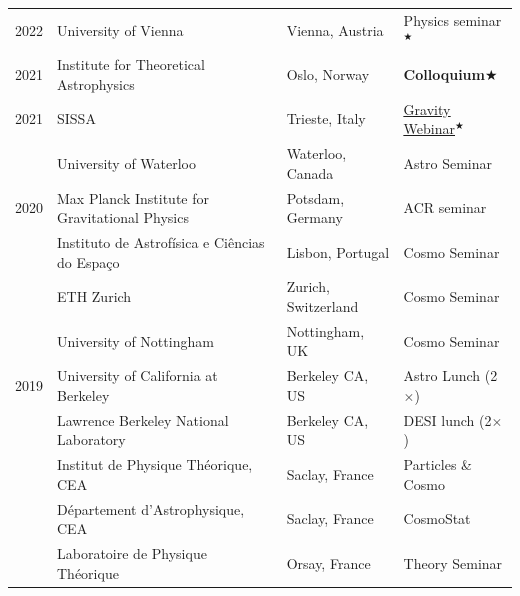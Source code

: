 \documentclass[11pt,a4paper]{article}
\begin{document}
\begin{longtable}{l p{} p{3.5cm} p{3cm}}
2022  & University of Vienna & Vienna, Austria & Physics seminar$^\bigstar$  %
\\
2021 & {Institute for Theoretical Astrophysics}  & Oslo, Norway & \textbf{Colloquium}$\bigstar$ \\ 
2021  & SISSA & Trieste, Italy & 
\href{https://www.youtube.com/watch?v=w2vnenwbJWY}{\underline{Gravity Webinar}}$^\bigstar$%
\\
& University of Waterloo & Waterloo, Canada & 
Astro Seminar%
\\
2020  & Max Planck Institute for Gravitational Physics %
& Potsdam, Germany & ACR seminar %
\\
& Instituto de Astrof\'isica e Ci\^encias do Espa\c{c}o & Lisbon, Portugal & Cosmo Seminar %
\\
& ETH Zurich & Zurich, Switzerland & Cosmo Seminar %
\\
& University of Nottingham & Nottingham, UK & Cosmo Seminar %
\\
2019  
& {University of California at Berkeley} & Berkeley CA, US & Astro Lunch (2$\times$) \\
& Lawrence Berkeley National Laboratory & Berkeley CA, US & DESI lunch (2$\times$) \\
& {Institut de Physique Th\'eorique, CEA} & Saclay, France & Particles \& Cosmo \\ 
& {D\'epartement d'Astrophysique, CEA} & Saclay, France & CosmoStat \\
& {Laboratoire de Physique Th\'eorique} & Orsay, France & Theory Seminar 

\end{longtable}
\end{document}
